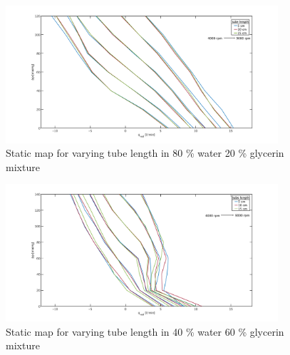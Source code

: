 \begin{figure}[ht]
  \includegraphics[width=0.9\textwidth]{images/plots_syst_ident/80w20g_tube_length.pdf}
  \caption[Static map for different tube length in 80 \% water 20 \% glycerin mixture]{Static map for varying tube length in 80 \% water 20 \% glycerin mixture}
\end{figure}

\begin{figure}[ht]
  \includegraphics[width=0.9\textwidth]{images/plots_syst_ident/40w60g_tube_length.pdf}
  \caption[Static map for different tube length in 40 \% water 60 \% glycerin mixture]{Static map for varying tube length in 40 \% water 60 \% glycerin mixture}
\end{figure}
